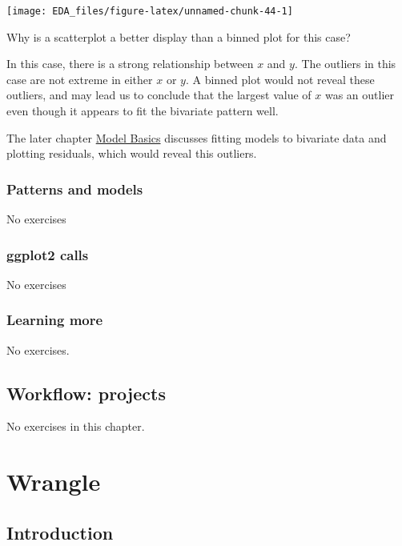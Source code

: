 \documentclass[]{book}
\theoremstyle{plain}
\theoremstyle{remark}
\theoremstyle{definition}
\theoremstyle{definition}
\theoremstyle{definition}
\theoremstyle{remark}
\begin{document}
\begin{center}\texttt{[image: EDA\_files/figure-latex/unnamed-chunk-44-1]} \end{center}

Why is a scatterplot a better display than a binned plot for this case?

In this case, there is a strong relationship between \(x\) and \(y\).
The outliers in this case are not extreme in either \(x\) or \(y\). A
binned plot would not reveal these outliers, and may lead us to conclude
that the largest value of \(x\) was an outlier even though it appears to
fit the bivariate pattern well.

The later chapter \protect\hyperlink{model-basics}{Model Basics}
discusses fitting models to bivariate data and plotting residuals, which
would reveal this outliers.

\hypertarget{patterns-and-models}{%
\section{Patterns and models}\label{patterns-and-models}}

No exercises

\hypertarget{ggplot2-calls}{%
\section{ggplot2 calls}\label{ggplot2-calls}}

No exercises

\hypertarget{learning-more}{%
\section{Learning more}\label{learning-more}}

No exercises.

\hypertarget{workflow-projects}{%
\chapter{Workflow: projects}\label{workflow-projects}}

No exercises in this chapter.

\hypertarget{part-wrangle}{%
\part{Wrangle}\label{part-wrangle}}

\hypertarget{introduction-4}{%
\chapter{Introduction}\label{introduction-4}}
\end{document}
